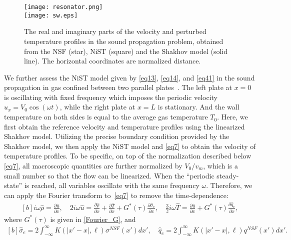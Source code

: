 \documentclass[lineno]{jfm}
\begin{document}


\begin{figure}
	\centering
 \texttt{[image: resonator.png]}\\
	\texttt{[image: sw.eps]}
	\caption{ The real and imaginary parts of the velocity and perturbed temperature profiles in the sound propagation problem, obtained from the NSF (star), NiST (square) and the Shakhov model (solid line). The horizontal coordinates are normalized distance.}
	\label{sw}
\end{figure}

We further assess the NiST model given by \eqref{eq13}, \eqref{eq14}, and \eqref{eq41} in the sound propagation in gas  confined between two parallel plates~\citep{cite18}. The left plate at $x=0$ is oscillating with fixed frequency which imposes the periodic velocity $u_x = V_0 \cos (\omega t)$, while the right plate at $x=L$ is stationary. And the wall temperature on both sides is equal to the average gas temperature $T_0$. Here, we first obtain the reference velocity and temperature profiles using the linearized Shakhov model. Utilizing the precise boundary condition provided by the Shakhov model, we then apply the NiST model and \eqref{eq7} to obtain the velocity of temperature profiles. To be specific, on top of the normalization described below \eqref{eq7}, all macroscopic quantities are further normalized by $V_0/v_m$, which is a small number so that the flow can be linearized. When the ``periodic steady-state'' is reached, all variables oscillate with the same frequency $\omega$. Therefore, we can apply the Fourier transform to~\eqref{eq7} to remove the time-dependence:
\begin{equation}\label{eq51}
	\begin{aligned}[b]
		i \omega \hat{\rho} =\frac{\partial \hat{u}}{\partial x}, \quad
		2 i \omega \hat{u}= \frac{\partial \hat{\rho}}{\partial x} + \frac{\partial \hat{T}}{\partial x} + G^\ast(\tau)\frac{\partial \hat{\sigma}_e}{\partial x}, \quad
		\frac{3}{2}i \omega \hat{T} = \frac{\partial \hat{u}}{\partial x} +G^\ast(\tau) \frac{\partial \hat{q}_e}{\partial x},
	\end{aligned}
\end{equation}
where $G^{\ast}(\tau)$ is given in \eqref{Fourier_G}, and
\begin{equation}
	\begin{aligned}[b]
		\hat{\sigma}_e =   2\int_{-\infty}^{\infty} K(|x'-x|,\ell) \sigma^{NSF}(x') dx',\quad
		\hat{q}_e =  2\int_{-\infty}^{\infty} K(|x'-x|,\ell) q^{NSF}(x') dx'.  
	\end{aligned}
\end{equation}
\end{document}
